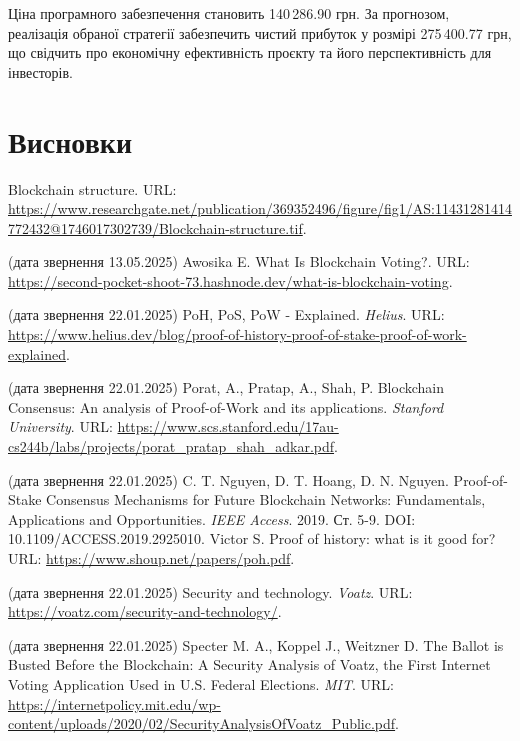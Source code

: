 \documentclass[14pt]{extreport}
\newcommand{\tocchap}[1]{
  \chapter*{#1}
  \addcontentsline{toc}{chapter}{\MakeUppercase{#1}}
}
\begin{document}
  Ціна програмного забезпечення становить 140\,286.90 грн. За прогнозом, реалізація обраної стратегії забезпечить чистий прибуток у розмірі 275\,400.77 грн, що свідчить про економічну ефективність проєкту та його перспективність для інвесторів.
  
  \tocchap{Висновки}
  
  \renewcommand\bibname{\MakeUppercase{Список літератури}}
  \begin{thebibliography}{99}
     Blockchain structure. URL: \url{https://www.researchgate.net/publication/369352496/figure/fig1/AS:11431281414772432@1746017302739/Blockchain-structure.tif}.

    (дата звернення 13.05.2025)
     Awosika E. What Is Blockchain Voting?. URL: \url{https://second-pocket-shoot-73.hashnode.dev/what-is-blockchain-voting}.

    (дата звернення 22.01.2025)
     PoH, PoS, PoW - Explained. \textit{Helius}. URL: \url{https://www.helius.dev/blog/proof-of-history-proof-of-stake-proof-of-work-explained}.
    
    (дата звернення 22.01.2025)
     Porat, A., Pratap, A., Shah, P. Blockchain Consensus: An analysis of Proof-of-Work and its applications. \textit{Stanford University}. URL: \url{https://www.scs.stanford.edu/17au-cs244b/labs/projects/porat_pratap_shah_adkar.pdf}.
    
    (дата звернення 22.01.2025)
     C. T. Nguyen, D. T. Hoang, D. N. Nguyen. Proof-of-Stake Consensus Mechanisms for Future Blockchain Networks: Fundamentals, Applications and Opportunities. \textit{IEEE Access}. 2019. Ст. 5-9. DOI: 10.1109/ACCESS.2019.2925010.
     Victor S. Proof of history: what is it good for? URL: \url{https://www.shoup.net/papers/poh.pdf}.
    
    (дата звернення 22.01.2025)
     Security and technology. \textit{Voatz}. URL: \url{https://voatz.com/security-and-technology/}.
    
    (дата звернення 22.01.2025)
     Specter M. A., Koppel J., Weitzner D. The Ballot is Busted Before the Blockchain: A Security Analysis of Voatz, the First Internet Voting Application Used in U.S. Federal Elections. \textit{MIT}. URL: \url{https://internetpolicy.mit.edu/wp-content/uploads/2020/02/SecurityAnalysisOfVoatz_Public.pdf}.


\end{thebibliography}
\end{document}
